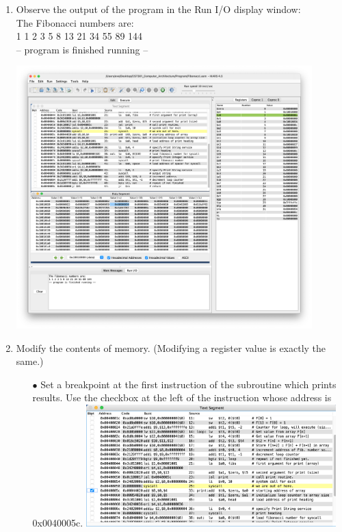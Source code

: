 \documentclass[12pt]{article}
\begin{document}
\begin{enumerate}
\begin{itemize}
        
    \end{itemize}
    \newpage
    \item Observe the output of the program in the Run I/O display window:\\
    The Fibonacci numbers are:\\
    1 1 2 3 5 8 13 21 34 55 89 144 \\
    -- program is finished running -- \\
            \begin{center}
            \includegraphics[width=0.9\textwidth]{26.png}
         \end{center}
    \newpage
    \item Modify the contents of memory. (Modifying a register value is exactly the same.)
    \begin{itemize}
        \item[$\bullet$] Set a breakpoint at the first instruction of the subroutine which prints results. Use the checkbox at the left of the instruction whose address is 0x0040005c.
        \includegraphics[width=0.8\textwidth]{27.png}


\end{itemize}
\end{enumerate}
\end{document}
